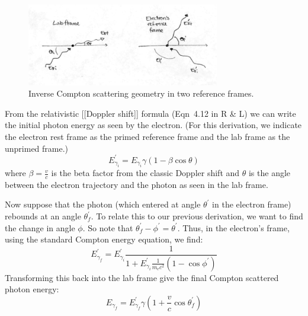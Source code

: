 \documentclass{article}
\begin{document}
\begin{figure}
    \centering
    \includegraphics[width=0.75\textwidth]{figures/800px-InverseCompton.png}
    \caption{Inverse Compton scattering geometry in two reference frames.
}
    \label{fig:invcomp}
\end{figure}


From the relativistic [[Doppler shift]] formula (Eqn~4.12 in R \& L) we can write the initial photon energy as seen by the electron. (For this derivation, we indicate the electron rest frame as the primed reference frame and the lab frame as the unprimed frame.)
$$ E^\prime_{\gamma_i} = E_{\gamma_i} \gamma (1-\beta \cos \theta)$$
where $\beta = \frac{v}{c}$ is the beta factor from the classic Doppler shift and $\theta$ is the angle between the electron trajectory and the photon as seen in the lab frame.

Now suppose that the photon (which entered at angle $\theta^\prime$ in the 
electron frame) rebounds at an angle $\theta_f^\prime$.  To relate this to
our previous derivation, we want to find the change in angle $\phi$.  So note that 
$\theta_f^\prime-\phi^\prime=\theta^\prime$.  Thus, in the electron's frame, using the standard Compton energy equation, we find:
$$E_{\gamma_f}^\prime={E_{\gamma_i}^\prime \frac{1}{1+{E_{\gamma_i}^\prime \frac{1}{ m_ec^2}(1-\cos\phi^\prime)}}}$$
Transforming this back into the lab frame give the final Compton scattered photon energy:
$$E_{\gamma_f}=E_{\gamma_f}^\prime\gamma(1+\frac{v}{ c}\cos\theta_f^\prime)$$
\end{document}
